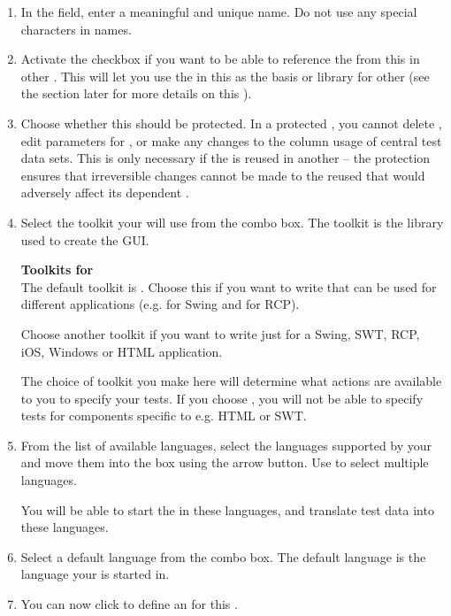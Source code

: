 \begin{enumerate}
\item In the  field, enter a meaningful and unique \gdproject{} name.
 Do not use any special characters in \gdproject{} names. 

\item Activate the  checkbox if you want to be able to reference the \gdcases{} from this \gdproject{} in other \gdprojects{}.
This will let you use  the \gdcases{} in this \gdproject{} as the basis or library for other \gdprojects{}  (see the section later for more details on this ). 

\item Choose whether this \gdproject{} should be protected. In a protected \gdprojects{}, you cannot delete \gdcases{},  edit parameters for \gdcases{}, or make any changes to the column usage of central test data sets. This is only necessary if the \gdproject{} is reused in another \gdproject{} -- the protection ensures that irreversible changes cannot be made to the reused \gdproject{} that would adversely affect its dependent \gdprojects{}.

\item Select the toolkit your \gdproject{} will use from the combo box. The toolkit is the library used to create the GUI. 

\textbf{Toolkits for \gdprojects{}}\\
\label{projtoolkit}
The default toolkit is . Choose this if you want to write \gdcases{} that can be used for different applications (e.g. for Swing and for RCP).

Choose another toolkit if you want to write \gdcases{} just for a Swing, SWT, RCP, iOS, Windows or HTML application. 

The choice of toolkit you make here will determine what actions are available to you to specify your tests. If you choose , you will not be able to specify tests for components specific to e.g. HTML or SWT.

\item From the list of available languages, select the languages supported by your \gdaut{} and move them into the  box using the arrow button. Use  to select multiple languages.

You will be able to start the \gdaut{} in these languages, and translate test data into these languages. 


\item Select a default language from the combo box. The default language is the language your \gdproject{} is started in. 

\item You can now click  to define an \gdaut{} for this \gdproject{} .
\end{enumerate}

